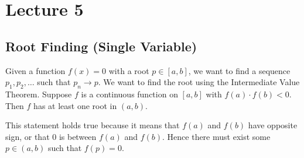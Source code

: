 \documentclass[class=article, crop=false]{standalone}
\begin{document}
  \section{Lecture 5}
  \subsection{Root Finding (Single Variable)}
  Given a function $f(x) = 0$ with a root $p\in [a, b]$, we want to find a sequence $p_1,p_2,\dotsc$ such that $p_n\to p$. We want to find the root using the Intermediate Value Theorem. Suppose $f$ is a continuous function on $[a, b]$ with $f(a)\cdot f(b) < 0$. Then $f$ has at least one root in $(a, b)$.
  \begin{note}{}
    This statement holds true because it means that $f(a)$ and $f(b)$ have opposite sign, or that $0$ is between $f(a)$ and $f(b)$. Hence there must exist some $p\in (a, b)$ such that $f(p) = 0$.
  \end{note}
\end{document}
